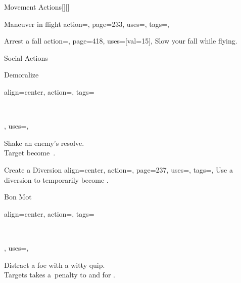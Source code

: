 \begin{PageBack}
\begin{Tables}{\backTableHeight}
\begin{Table}{Movement Actions}[][]
\begin{entry}{Maneuver in flight}{%
                action=,
                page=233,
                uses={\Acrobatics[tags={T}]},
                tags=\Move,
            }
            \end{entry}
            \begin{entry}{Arrest a fall}{%
                action=,
                page=418,
                uses={[val=15]},
            }
                Slow your fall while flying.
            \end{entry}
        \end{Table}
        \TableSpace
        \begin{Table}{Social Actions}
            \begin{entry}{Demoralize}{%
                align=center,
                action=,
                tags=\parbox{0.52\linewidth}{\raggedleft{}\,\Concentrate\\\Mental\Emotion\Fear},
                uses=\InitimidationWill,
            }
                Shake an enemy's resolve. \Auditory \ \hfill
                \\
                Target become \Frightened\,.\hfill
            \end{entry}
            \begin{entry}{Create a Diversion}{%
                align=center,
                action=,
                page=237,
                uses=\DeceptionPerception,
                tags=\Mental,
            }
                Use a diversion to temporarily become \Hidden.\hfill
                \\
            \end{entry}
            \begin{entry}{Bon Mot}{%
                align=center,
                action=,
                tags=\parbox{0.5\linewidth}{\raggedleft{}\,\Concentrate\\\Auditory\Linguistic},
                uses={\DiplomacyWill[tags={T}]\Feat},
            }
                Distract a foe with a witty quip. \Emotion\Mental\hfill {}\\
                Targets takes a \,\Status penalty to \PerceptionT and \WillT {} for .

\end{entry}
\end{Table}
\end{Tables}
\end{PageBack}
